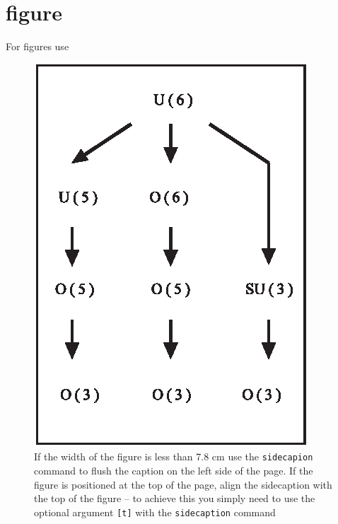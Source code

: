 \section{figure}

For figures use
\begin{figure}[htbp]
\sidecaption
\includegraphics[scale=.65]{figure}
%
%
\caption{If the width of the figure is less than 7.8 cm use the \texttt{sidecapion} command to flush the caption on the left side of the page. If the figure is positioned at the top of the page, align the sidecaption with the top of the figure -- to achieve this you simply need to use the optional argument \texttt{[t]} with the \texttt{sidecaption} command}
\label{fig:1}       %
\end{figure}


